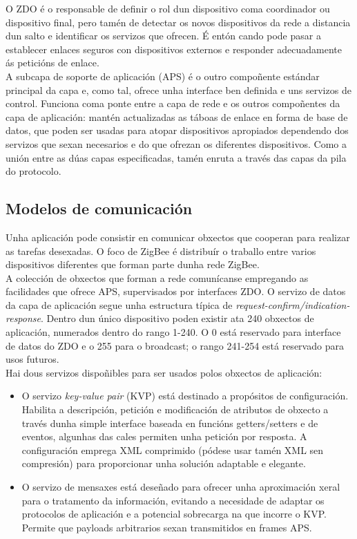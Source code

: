  O ZDO é o responsable de definir o rol dun dispositivo coma coordinador ou
 dispositivo final, pero tamén de detectar os novos dispositivos da rede a
 distancia dun salto e identificar os servizos que ofrecen. É entón cando pode
 pasar a establecer enlaces seguros con dispositivos externos e responder
 adecuadamente ás peticións de enlace. \\

 A subcapa de soporte de aplicación (APS) é o outro compoñente estándar
 principal da capa e, como tal, ofrece unha interface ben definida e uns
 servizos de control. Funciona coma ponte entre a capa de rede e os outros
 compoñentes da capa de aplicación: mantén actualizadas as táboas de enlace en
 forma de base de datos, que poden ser usadas para atopar dispositivos
 apropiados dependendo dos servizos que sexan necesarios e do que ofrezan os
 diferentes dispositivos. Como a unión entre as dúas capas especificadas, tamén
 enruta a través das capas da pila do protocolo.

 \subsection{Modelos de comunicación}

 Unha aplicación pode consistir en comunicar obxectos que cooperan para
 realizar as tarefas desexadas. O foco de ZigBee é distribuír o traballo
 entre varios dispositivos diferentes que forman parte dunha rede ZigBee. \\

 A colección de obxectos que forman a rede comunícanse empregando as
 facilidades que ofrece APS, supervisados por interfaces ZDO. O servizo de
 datos da capa de aplicación segue unha estructura típica de
 \textit{request-confirm/indication-response}. Dentro dun único dispositivo
 poden existir ata 240 obxectos de aplicación, numerados dentro do rango 1-240.
 O 0 está reservado para interface de datos do ZDO e o 255 para o broadcast; o
 rango 241-254 está reservado para usos futuros. \\

 Hai dous servizos dispoñibles para ser usados polos obxectos de aplicación:

 \begin{itemize}
  \item O servizo \textit{key-value pair} (KVP) está destinado a propósitos de
        configuración. Habilita a descripción, petición e modificación de
        atributos de obxecto a través dunha simple interface baseada en
        funcións getters/setters e de eventos, algunhas das cales permiten unha
        petición por resposta. A configuración emprega XML comprimido (pódese
        usar tamén XML sen compresión) para proporcionar unha solución
        adaptable e elegante.
  \item O servizo de mensaxes está deseñado para ofrecer unha aproximación
        xeral para o tratamento da información, evitando a necesidade de
        adaptar os protocolos de aplicación e a potencial sobrecarga na que
        incorre o KVP. Permite que payloads arbitrarios sexan transmitidos en
        frames APS.
 \end{itemize}

